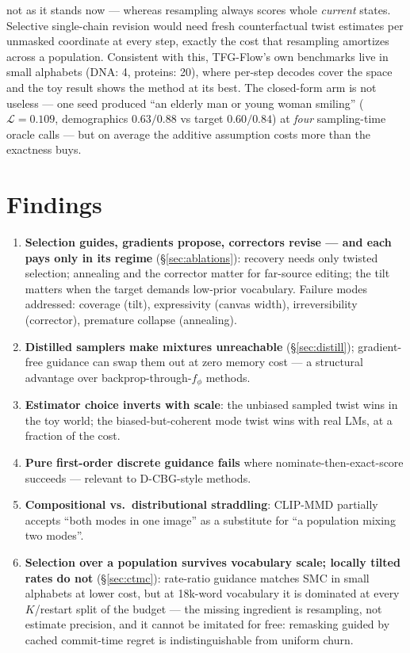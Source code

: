 \documentclass[11pt]{article}
\newcommand{\Ploss}{\mathcal{L}}
\begin{document}
not as it stands now --- whereas resampling always scores whole
\emph{current} states. Selective single-chain revision would need fresh
counterfactual twist estimates per unmasked coordinate at every step,
exactly the cost that resampling amortizes across a population.
Consistent with this,
TFG-Flow's own benchmarks live in small alphabets (DNA: 4, proteins: 20),
where per-step decodes cover the space and the toy result shows the
method at its best. The closed-form arm is not useless --- one seed
produced ``an elderly man or young woman smiling'' ($\Ploss{=}0.109$,
demographics $0.63/0.88$ vs target $0.60/0.84$) at \emph{four}
sampling-time oracle calls --- but on average the additive assumption
costs more than the exactness buys.

\section{Findings}
\begin{enumerate}
\item \textbf{Selection guides, gradients propose, correctors revise ---
and each pays only in its regime} (\S\ref{sec:ablations}): recovery needs
only twisted selection; annealing and the corrector matter for far-source
editing; the tilt matters when the target demands low-prior vocabulary.
Failure modes addressed: coverage (tilt), expressivity (canvas width),
irreversibility (corrector), premature collapse (annealing).
\item \textbf{Distilled samplers make mixtures unreachable}
(\S\ref{sec:distill}); gradient-free guidance can swap them out at zero
memory cost --- a structural advantage over backprop-through-$f_\phi$
methods.
\item \textbf{Estimator choice inverts with scale}: the unbiased sampled
twist wins in the toy world; the biased-but-coherent mode twist wins with
real LMs, at a fraction of the cost.
\item \textbf{Pure first-order discrete guidance fails} where
nominate-then-exact-score succeeds --- relevant to D-CBG-style methods.
\item \textbf{Compositional vs.\ distributional straddling}: CLIP-MMD
partially accepts ``both modes in one image'' as a substitute for ``a
population mixing two modes''.
\item \textbf{Selection over a population survives vocabulary scale;
locally tilted rates do not} (\S\ref{sec:ctmc}): rate-ratio guidance
matches SMC in small alphabets at lower cost, but at 18k-word vocabulary
it is dominated at every $K$/restart split of the budget --- the missing
ingredient is resampling, not estimate precision, and it cannot be
imitated for free: remasking guided by cached commit-time regret is
indistinguishable from uniform churn.
\end{enumerate}
\end{document}
